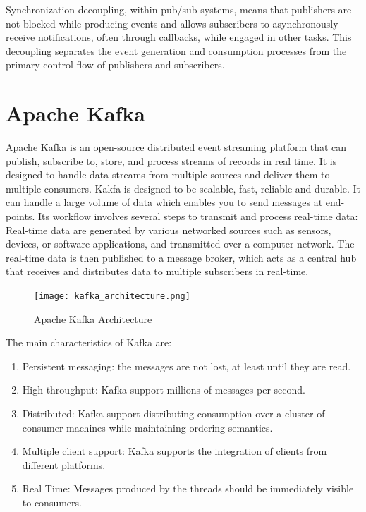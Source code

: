 Synchronization decoupling, within pub/sub systems, means that publishers are
not blocked while producing events and allows subscribers to asynchronously
receive notifications, often through callbacks, while engaged in other tasks.
This decoupling separates the event generation and consumption processes
from the primary control flow of publishers and subscribers.

\section{Apache Kafka}

Apache Kafka is an open-source distributed event streaming platform that can
publish, subscribe to, store, and process streams of records in real time.
It is designed to handle data streams from multiple sources and deliver them to
multiple consumers. \cite{garg2013apache}
Kakfa is designed to be scalable, fast, reliable and durable. It can handle a
large volume of data which enables you to send messages at end-points.
Its workflow involves several steps to transmit and process real-time data:
Real-time data are generated by various networked sources such as sensors,
devices, or software applications, and transmitted over a computer network.
The real-time data is then published to a message broker, which acts as a
central hub that receives and distributes data to multiple subscribers in
real-time. \cite{raptis2023survey}

\begin{figure}[ht]
    \centering
    \texttt{[image: kafka\_architecture.png]}
    \caption{Apache Kafka Architecture}
\end{figure}

The main characteristics of Kafka are:

\begin{enumerate}
    \item   Persistent messaging: the messages are not lost, at least until
            they are read.
    \item   High throughput: Kafka support millions of messages per second.
    \item   Distributed: Kafka support distributing consumption over a cluster
            of consumer machines while maintaining ordering semantics.
    \item   Multiple client support: Kafka supports the integration of clients
            from different platforms.
    \item   Real Time: Messages produced by the threads should be immediately
            visible to consumers.
\end{enumerate}

